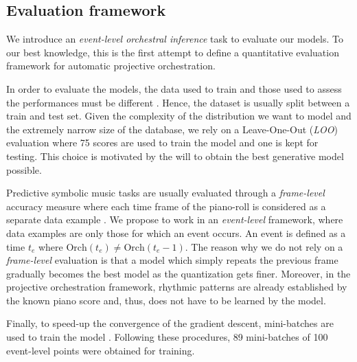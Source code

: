 \documentclass{article}
\begin{document}
\subsection{Evaluation framework}


We introduce an \textit{event-level orchestral inference} task to evaluate our models. To our best knowledge, this is the first attempt to define a quantitative evaluation framework for automatic projective orchestration.

In order to evaluate the models, the data used to train and those used to assess the performances must be different \cite{bishop2006pattern}. Hence, the dataset is usually split between a train and test set.
Given the complexity of the distribution we want to model and the extremely narrow size of the database, we rely on a Leave-One-Out (\textit{LOO}) evaluation where 75 scores are used to train the model and one is kept for testing. This choice is motivated by the will to obtain the best generative model possible.

Predictive symbolic music tasks are usually evaluated through a \textit{frame-level} accuracy measure where each time frame of the piano-roll is considered as a separate data example \cite{DBLP:journals/corr/YaoCVDD15,boulanger2012modeling,lavrenko2003polyphonic}.
We propose to work in an \textit{event-level} framework, where data examples are only those for which an event occurs. An event is defined as a time $t_{e}$ where $\text{Orch}(t_{e}) \neq \text{Orch}(t_{e} - 1)$. The reason why we do not rely on a \textit{frame-level} evaluation is that a model which simply repeats the previous frame gradually becomes the best model as the quantization gets finer. Moreover, in the projective orchestration framework, rhythmic patterns are already established by the known piano score and, thus, does not have to be learned by the model.

Finally, to speed-up the convergence of the gradient descent, mini-batches are used to train the model \cite{bishop2006pattern}. Following these procedures, 89 mini-batches of 100 event-level points were obtained for training.
\end{document}
